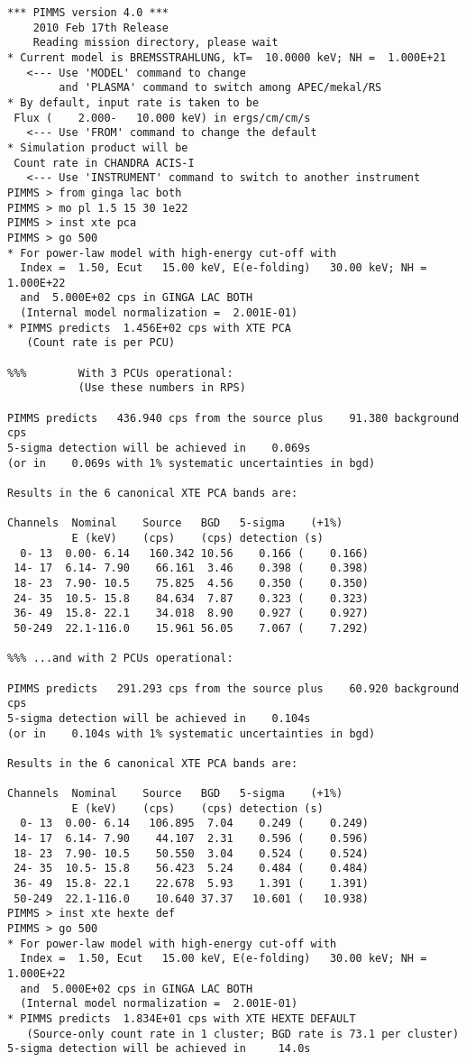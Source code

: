 \begin{verbatim}
*** PIMMS version 4.0 ***
    2010 Feb 17th Release
    Reading mission directory, please wait
* Current model is BREMSSTRAHLUNG, kT=  10.0000 keV; NH =  1.000E+21
   <--- Use 'MODEL' command to change
        and 'PLASMA' command to switch among APEC/mekal/RS
* By default, input rate is taken to be
 Flux (    2.000-   10.000 keV) in ergs/cm/cm/s
   <--- Use 'FROM' command to change the default
* Simulation product will be
 Count rate in CHANDRA ACIS-I
   <--- Use 'INSTRUMENT' command to switch to another instrument
PIMMS > from ginga lac both
PIMMS > mo pl 1.5 15 30 1e22
PIMMS > inst xte pca
PIMMS > go 500
* For power-law model with high-energy cut-off with
  Index =  1.50, Ecut   15.00 keV, E(e-folding)   30.00 keV; NH =  1.000E+22
  and  5.000E+02 cps in GINGA LAC BOTH
  (Internal model normalization =  2.001E-01)
* PIMMS predicts  1.456E+02 cps with XTE PCA
   (Count rate is per PCU)

%%%        With 3 PCUs operational:
           (Use these numbers in RPS)

PIMMS predicts   436.940 cps from the source plus    91.380 background cps
5-sigma detection will be achieved in    0.069s
(or in    0.069s with 1% systematic uncertainties in bgd)

Results in the 6 canonical XTE PCA bands are:

Channels  Nominal    Source   BGD   5-sigma    (+1%)
          E (keV)    (cps)    (cps) detection (s)
  0- 13  0.00- 6.14   160.342 10.56    0.166 (    0.166)
 14- 17  6.14- 7.90    66.161  3.46    0.398 (    0.398)
 18- 23  7.90- 10.5    75.825  4.56    0.350 (    0.350)
 24- 35  10.5- 15.8    84.634  7.87    0.323 (    0.323)
 36- 49  15.8- 22.1    34.018  8.90    0.927 (    0.927)
 50-249  22.1-116.0    15.961 56.05    7.067 (    7.292)

%%% ...and with 2 PCUs operational:

PIMMS predicts   291.293 cps from the source plus    60.920 background cps
5-sigma detection will be achieved in    0.104s
(or in    0.104s with 1% systematic uncertainties in bgd)

Results in the 6 canonical XTE PCA bands are:

Channels  Nominal    Source   BGD   5-sigma    (+1%)
          E (keV)    (cps)    (cps) detection (s)
  0- 13  0.00- 6.14   106.895  7.04    0.249 (    0.249)
 14- 17  6.14- 7.90    44.107  2.31    0.596 (    0.596)
 18- 23  7.90- 10.5    50.550  3.04    0.524 (    0.524)
 24- 35  10.5- 15.8    56.423  5.24    0.484 (    0.484)
 36- 49  15.8- 22.1    22.678  5.93    1.391 (    1.391)
 50-249  22.1-116.0    10.640 37.37   10.601 (   10.938)
PIMMS > inst xte hexte def
PIMMS > go 500
* For power-law model with high-energy cut-off with
  Index =  1.50, Ecut   15.00 keV, E(e-folding)   30.00 keV; NH =  1.000E+22
  and  5.000E+02 cps in GINGA LAC BOTH
  (Internal model normalization =  2.001E-01)
* PIMMS predicts  1.834E+01 cps with XTE HEXTE DEFAULT
   (Source-only count rate in 1 cluster; BGD rate is 73.1 per cluster)
5-sigma detection will be achieved in     14.0s


\end{verbatim}

